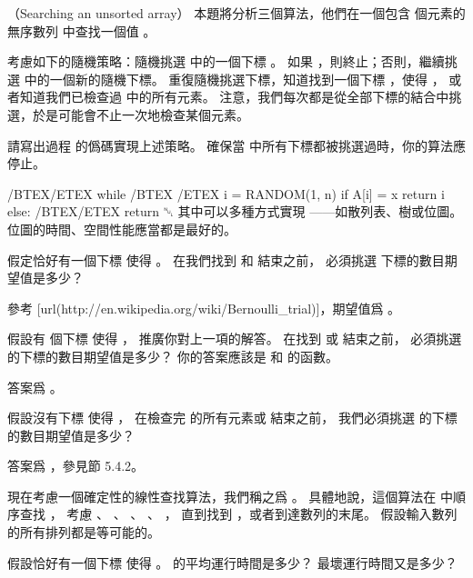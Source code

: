\startPROBLEM（Searching an unsorted array）
本題將分析三個算法，他們在一個包含  個元素的無序數列  中查找一個值 。

考慮如下的隨機策略：隨機挑選  中的一個下標 。
如果 ，則終止；否則，繼續挑選  中的一個新的隨機下標。
重復隨機挑選下標，知道找到一個下標 ，使得 ，
或者知道我們已檢查過  中的所有元素。
注意，我們每次都是從全部下標的結合中挑選，於是可能會不止一次地檢查某個元素。
\startigBase[a]
\item 請寫出過程  的僞碼實現上述策略。
確保當  中所有下標都被挑選過時，你的算法應停止。
\stopigBase

\startANSWER
{}
\startCLRS
/BTEX/ETEX
while /BTEX  /ETEX
	i = RANDOM(1, n)
	if A[i] = x
		return i
	else:
		/BTEX/ETEX
return ␀
\stopCLRS
其中可以多種方式實現 ——如散列表、樹或位圖。位圖的時間、空間性能應當都是最好的。
\stopANSWER

\startigBase[continue]
\item 假定恰好有一個下標  使得 。
在我們找到  和  結束之前，
必須挑選  下標的數目期望值是多少？
\stopigBase

\startANSWER
參考 [url(http://en.wikipedia.org/wiki/Bernoulli_trial)]，期望值爲 。
\stopANSWER

\startigBase[continue]
\item 假設有  個下標  使得 ，
推廣你對上一項的解答。
在找到  或  結束之前，
必須挑選  的下標的數目期望值是多少？
你的答案應該是  和  的函數。
\stopigBase

\startANSWER
答案爲 。
\stopANSWER

\startigBase[continue]
\item 假設沒有下標  使得 ，
在檢查完  的所有元素或  結束之前，
我們必須挑選  的下標的數目期望值是多少？
\stopigBase

\startANSWER
答案爲 ，參見節 5.4.2。
\stopANSWER

現在考慮一個確定性的線性查找算法，我們稱之爲 。
具體地說，這個算法在  中順序查找 ，
考慮 、 、 、 \m{\ldots}、 ，
直到找到 ，或者到達數列的末尾。
假設輸入數列的所有排列都是等可能的。
\startigBase[continue]
\item 假設恰好有一個下標  使得 。
 的平均運行時間是多少？
最壞運行時間又是多少？
\stopigBase


